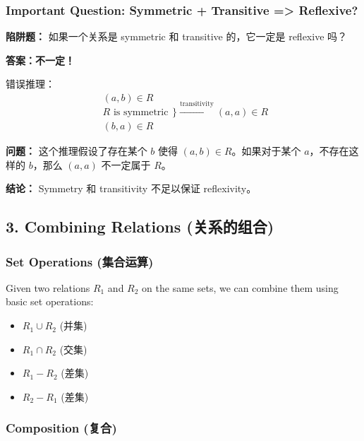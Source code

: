 \documentclass[10pt,a4paper,openany]{ctexbook}
\theoremstyle{definition}
\theoremstyle{remark}
\renewenvironment{quote}
  {\list{}{\leftmargin=1em\rightmargin=0pt\topsep=0.5pt\partopsep=0pt}\item[]}
  {\endlist}
\begin{document}
\vspace{-2pt}

\subsubsection{Important Question: Symmetric + Transitive => Reflexive?}

\begin{quote}
\textbf{陷阱题：} 如果一个关系是 symmetric 和 transitive 的，它一定是 reflexive 吗？

\textbf{答案：不一定！}

错误推理：
\[
\begin{array}{c}
(a,b) \in R \\
R \text{ is symmetric} \\
\hline
(b,a) \in R
\end{array}
\Bigg\} \xrightarrow{\text{transitivity}} (a,a) \in R
\]


\textbf{问题：} 这个推理假设了存在某个 $b$ 使得 $(a,b) \in R$。如果对于某个 $a$，不存在这样的 $b$，那么 $(a,a)$ 不一定属于 $R$。

\textbf{结论：} Symmetry 和 transitivity 不足以保证 reflexivity。

\end{quote}
\vspace{-2pt}

\subsection{3. Combining Relations (关系的组合)}

\subsubsection{Set Operations (集合运算)}

Given two relations $R_1$ and $R_2$ on the same sets, we can combine them using basic set operations:
\begin{itemize}
\item $R_1 \cup R_2$ (并集)
\item $R_1 \cap R_2$ (交集)
\item $R_1 - R_2$ (差集)
\item $R_2 - R_1$ (差集)

\end{itemize}

\subsubsection{Composition (复合)}
\end{document}
